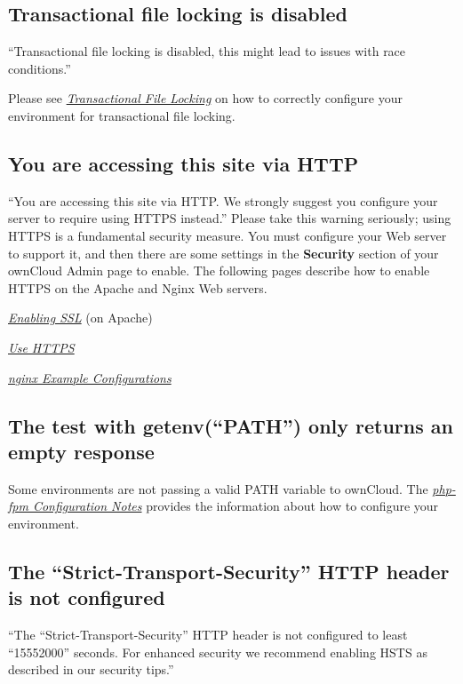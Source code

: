 \documentclass[letterpaper,10pt,english]{sphinxmanual}
\begin{document}
\subsection{Transactional file locking is disabled}
\label{configuration_server/security_setup_warnings:transactional-file-locking-is-disabled}
``Transactional file locking is disabled, this might lead to issues with race
conditions.''

Please see {\hyperref[configuration_files/files_locking_transactional::doc]{\emph{Transactional File Locking}}} on how
to correctly configure your environment for transactional file locking.


\subsection{You are accessing this site via HTTP}
\label{configuration_server/security_setup_warnings:you-are-accessing-this-site-via-http}
``You are accessing this site via HTTP. We strongly suggest you configure your
server to require using HTTPS instead.'' Please take this warning seriously;
using HTTPS is a fundamental security measure. You must configure your Web
server to support it, and then there are some settings in the \textbf{Security}
section of your ownCloud Admin page to enable. The following pages
describe how to enable HTTPS on the Apache and Nginx Web servers.

{\hyperref[installation/source_installation:enabling-ssl-label]{\emph{Enabling SSL}}} (on Apache)

{\hyperref[configuration_server/harden_server:use-https-label]{\emph{Use HTTPS}}}

{\hyperref[installation/nginx_examples::doc]{\emph{nginx Example Configurations}}}


\subsection{The test with getenv(``PATH'') only returns an empty response}
\label{configuration_server/security_setup_warnings:the-test-with-getenv-path-only-returns-an-empty-response}
Some environments are not passing a valid PATH variable to ownCloud. The
{\hyperref[installation/source_installation:php-fpm-tips-label]{\emph{php-fpm Configuration Notes}}} provides the information about how to configure your
environment.


\subsection{The ``Strict-Transport-Security'' HTTP header is not configured}
\label{configuration_server/security_setup_warnings:the-strict-transport-security-http-header-is-not-configured}
``The ``Strict-Transport-Security'' HTTP header is not configured to least ``15552000'' seconds.
For enhanced security we recommend enabling HSTS as described in our security tips.''
\end{document}
